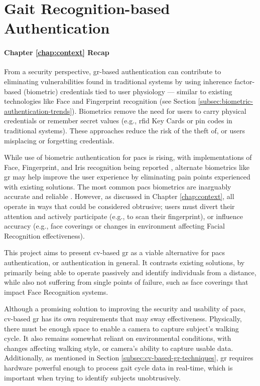 \section{Gait Recognition-based Authentication}
\label{sec:new-ideas-gait-recognition}

\paragraph{Chapter \ref{chap:context} Recap} From a security perspective, \ac{gr}-based authentication can contribute to eliminating vulnerabilities found in traditional systems by using inherence factor-based (biometric) credentials tied to user physiology --- similar to existing technologies like Face and Fingerprint recognition (see Section \ref{subsec:biometric-authentication-trends}).
Biometrics remove the need for users to carry physical credentials or remember secret values (e.g., \ac{rfid} Key Cards or \ac{pin} codes in traditional systems).
These approaches reduce the risk of the theft of, or users misplacing or forgetting credentials.

While use of biometric authentication for \ac{pacs} is rising, with implementations of Face, Fingerprint, and Iris recognition being reported \parencite{ifsecglobalStatePhysicalAccess2024}, alternate biometrics like \ac{gr} may help improve the user experience by eliminating pain points experienced with existing solutions.
The most common \ac{pacs} biometrics are inarguably accurate and reliable \parencite{nationalinstituteofstandardsandtechnologyNISTStudyShows2004,universityofbaghdadHighaccuracyModelsIris2024}.
However, as discussed in Chapter \ref{chap:context}, all operate in ways that could be considered obtrusive; users must divert their attention and actively participate (e.g., to scan their fingerprint), or influence accuracy (e.g., face coverings \parencite{cooperEffectsFaceCoverings2022} or changes in environment \parencite{brajeIlluminationEffectsFace1998} affecting Facial Recognition effectiveness).

This project aims to present \ac{cv}-based \ac{gr} as a viable alternative for \ac{pacs} authentication, or authentication in general.
It contrasts existing solutions, by primarily being able to operate passively and identify individuals from a distance, while also not suffering from single points of failure, such as face coverings that impact Face Recognition systems.

Although a promising solution to improving the security and usability of \ac{pacs}, \ac{cv}-based \ac{gr} has its own requirements that may sway effectiveness.
Physically, there must be enough space to enable a camera to capture subject's walking cycle.
It also remains somewhat reliant on environmental conditions, with changes affecting walking style, or camera's ability to capture usable data.
Additionally, as mentioned in Section \ref{subsec:cv-based-gr-techniques}, \ac{gr} requires hardware powerful enough to process gait cycle data in real-time, which is important when trying to identify subjects unobtrusively.

